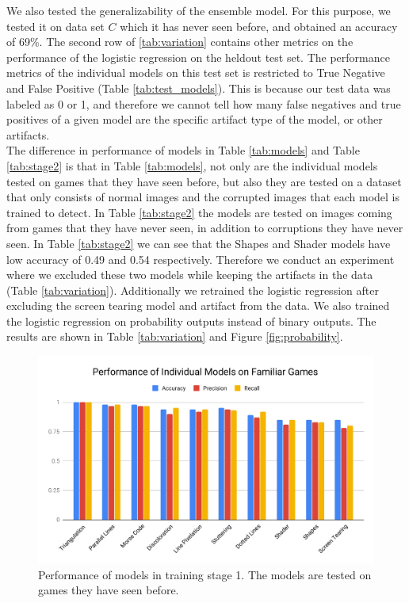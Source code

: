 \noindent
We also tested the generalizability of the ensemble model. For this purpose, we tested it on data set $C$ which it has never seen before, and obtained an accuracy of 69\%. The second row of \ref{tab:variation} contains other metrics on the performance of the logistic regression on the heldout test set. The performance metrics of the individual models on this test set is restricted to True Negative and False Positive (Table \ref{tab:test_models}). This is because our test data was labeled as 0 or 1, and therefore we cannot tell how many false negatives and true positives of a given model are the specific artifact type of the model, or other artifacts. \\

\noindent The difference in performance of models in Table \ref{tab:models}
and Table \ref{tab:stage2} is that in Table \ref{tab:models}, not only are the individual models tested on games that they have seen before, but also they are tested on a dataset that only consists of normal images and the corrupted images that each model is trained to detect. In Table \ref{tab:stage2} the models are tested on images coming from games that they have never seen, in addition to corruptions they have never seen. In Table \ref{tab:stage2} we can see that the Shapes and Shader models have low accuracy of 0.49 and 0.54 respectively. Therefore we conduct an experiment where we excluded these two models while keeping the artifacts in the data (Table \ref{tab:variation}). Additionally we retrained the logistic regression after excluding the screen tearing model and artifact from the data. We also trained the logistic regression on probability outputs instead of binary outputs. The results are shown in Table \ref{tab:variation} and Figure \ref{fig:probability}.


\begin{figure}
    \centering
    \includegraphics[scale=0.7]{images/stage1fig.pdf}
    \caption[Performance of models in training stage 1]{Performance of models in training stage 1. The models are tested on games they have seen before.}
    \label{fig:stage1}
\end{figure}


